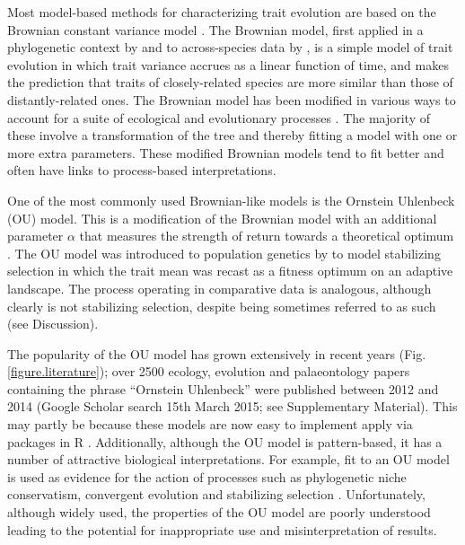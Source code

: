 \documentclass[a4paper,12pt]{article}
\begin{document}
  Most model-based methods for characterizing trait evolution are based on the Brownian constant variance model \citep[for exceptions see][]{price1997correlated,harvey2000comparative,freckleton2006detecting}. 
  The Brownian model, first applied in a phylogenetic context by \citet{cavalli1967} and to across-species data by \citet{felsenstein1973maximum}, is a simple model of trait evolution in which trait variance accrues as a linear function of time, and makes the prediction that traits of closely-related species are more similar than those of distantly-related ones. 
  The Brownian model has been modified in various ways to account for a suite of ecological and evolutionary processes \citep[e.g.,][]{grafen1989phylogenetic,hansen1997stabilizing,Pagel:1997aa,Pagel:1999aa}. 
  The majority of these involve a transformation of the tree and thereby fitting a model with one or more extra parameters. 
  These modified Brownian models tend to fit better and often have links to process-based interpretations. 

  One of the most commonly used Brownian-like models is the Ornstein Uhlenbeck (OU) model. 
  This is a modification of the Brownian model with an additional parameter $\alpha$ that measures the strength of return towards a theoretical optimum \citep{hansen1997stabilizing}. 
  The OU model was introduced to population genetics by \cite{Lande:1976aa} to model stabilizing selection in which the trait mean was recast as a fitness optimum on an adaptive landscape. 
  The process operating in comparative data is analogous, although clearly is not stabilizing selection, despite being sometimes referred to as such (see Discussion).

  The popularity of the OU model has grown extensively in recent years (Fig. \ref{figure.literature}); over 2500 ecology, evolution and palaeontology papers containing the phrase ``Ornstein Uhlenbeck'' were published between 2012 and 2014 (Google Scholar search 15th March 2015; see Supplementary Material). %
  This may partly be because these models are now easy to implement apply via packages in R \citep[e.g. ouch, GEIGER and OUwie;][]{Butler:2004aa,Harmon:2008aa,beaulieu2012ouwie}. 
  Additionally, although the OU model is pattern-based, it has a number of attractive biological interpretations. 
  For example, fit to an OU model is used as evidence for the action of processes such as phylogenetic niche conservatism, convergent evolution and stabilizing selection \citep[e.g.,][]{Wiens:2010aa,christin2013anatomical,ingram2013surface}. 
  Unfortunately, although widely used, the properties of the OU model are poorly understood leading to the potential for inappropriate use and misinterpretation of results. 
 
\end{document}
